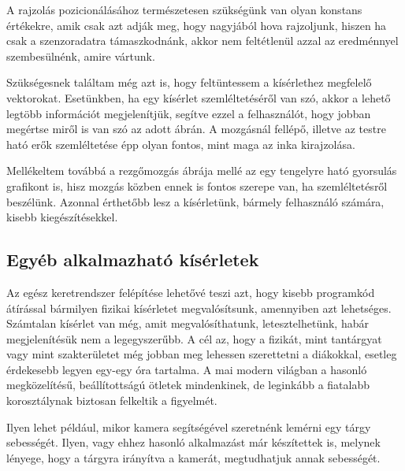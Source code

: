 \documentclass{thesis-ekf}
\theoremstyle{definition}
\theoremstyle{remark}
\begin{document}
\par A rajzolás pozicionálásához természetesen szükségünk van olyan konstans értékekre, amik csak azt adják meg, hogy nagyjából hova rajzoljunk, hiszen ha csak a szenzoradatra támaszkodnánk, akkor nem feltétlenül azzal az eredménnyel szembesülnénk, amire vártunk.
\par Szükségesnek találtam még azt is, hogy feltüntessem a kísérlethez megfelelő vektorokat. Esetünkben, ha egy kísérlet szemléltetéséről van szó, akkor a lehető legtöbb információt megjelenítjük, segítve ezzel a felhasználót, hogy jobban megértse miről is van szó az adott ábrán. A mozgásnál fellépő, illetve az testre ható erők szemléltetése épp olyan fontos, mint maga az inka kirajzolása.
\par Mellékeltem továbbá a rezgőmozgás ábrája mellé az egy tengelyre ható gyorsulás grafikont is, hisz mozgás közben ennek is fontos szerepe van, ha szemléltetésről beszélünk. Azonnal érthetőbb lesz a kísérletünk, bármely felhasználó számára, kisebb kiegészítésekkel.
\subsection{Egyéb alkalmazható kísérletek}
Az egész keretrendszer felépítése lehetővé teszi azt, hogy kisebb programkód átírással bármilyen fizikai kísérletet megvalósítsunk, amennyiben azt lehetséges. Számtalan kísérlet van még, amit megvalósíthatunk, letesztelhetünk, habár megjelenítésük nem a legegyszerűbb. A cél az, hogy a fizikát, mint tantárgyat vagy mint szakterületet még jobban meg lehessen szerettetni a diákokkal, esetleg érdekesebb legyen egy-egy óra tartalma. A mai modern világban a hasonló megközelítésű, beállítottságú ötletek mindenkinek, de leginkább a fiatalabb korosztálynak biztosan felkeltik a figyelmét.
\par Ilyen lehet például, mikor kamera segítségével szeretnénk lemérni egy tárgy sebességét. Ilyen, vagy ehhez hasonló alkalmazást már készítettek is, melynek lényege, hogy a tárgyra irányítva a kamerát, megtudhatjuk annak sebességét.
\end{document}
